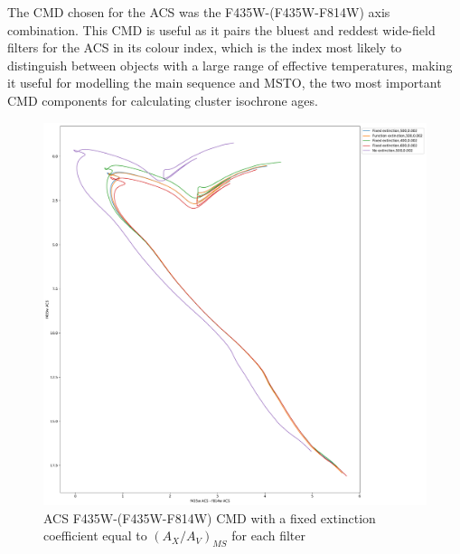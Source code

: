\documentclass[12pt, a4paper]{report}
\begin{document}
The CMD chosen for the ACS was the F435W-(F435W-F814W) axis combination. This CMD is useful as it pairs the bluest and reddest wide-field filters for the ACS in its colour index, which is the index most likely to distinguish between objects with a large range of effective temperatures, making it useful for modelling the main sequence and MSTO, the two most important CMD components for calculating cluster isochrone ages.

\begin{figure}[h]
\begin{center}
\includegraphics[scale=0.3]{../basti_isochrones_10_13Gyr/Extinction_T5k_FeH0fix_func_f435wACS_f435wACSmf814wACS_500_400_600_Myr_FeH_0p002_ref_noext_Av_1p0.pdf}
\caption{ACS F435W-(F435W-F814W) CMD with a fixed extinction coefficient equal to $(A_{X}/A_{V})_{MS}$ for each filter}
\label{acs_isoc_T5k}
\end{center}
\end{figure}
\end{document}
